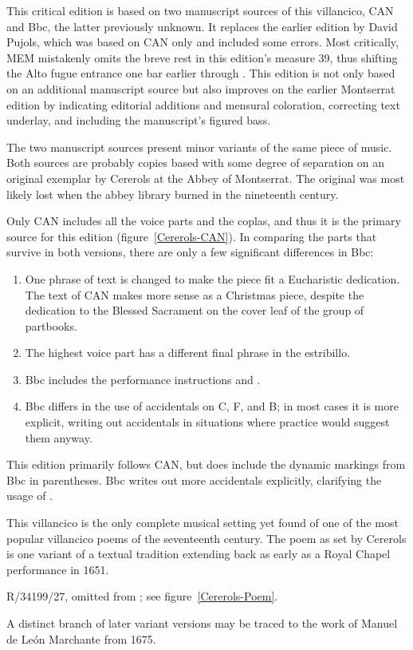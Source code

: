 This critical edition is based on two manuscript sources of this villancico, 
CAN and Bbc, the latter previously unknown.
It replaces the earlier edition by David Pujols, which was based on CAN only 
and included some errors.
Most critically, MEM mistakenly omits the breve rest in this edition's measure 
39, thus shifting the Alto fugue entrance one bar earlier through .
This edition is not only based on an additional manuscript source but also 
improves on the earlier Montserrat edition by indicating editorial additions 
and mensural coloration, correcting text underlay, and including the 
manuscript's figured bass.

The two manuscript sources present minor variants of the same piece of music.
Both sources are probably copies based with some degree of separation on an 
original exemplar by Cererols at the Abbey of Montserrat.
The original was most likely lost when the abbey library burned in the 
nineteenth century.

Only CAN includes all the voice parts and the coplas, and thus it is the 
primary source for this edition (figure~\ref{Cererols-CAN}).%
  \autocite[60--61]{Bonastre:CanetCatalog}
In comparing the parts that survive in both versions, there are only a few 
significant differences in Bbc: 
\begin{enumerate}
    \item One phrase of text is changed to make the piece fit a Eucharistic
        dedication.  
        The text of CAN makes more sense as a Christmas piece, despite the
        dedication to the Blessed Sacrament on the cover leaf of the group of
        partbooks.
    \item The highest voice part has a different final phrase in the estribillo.
    \item Bbc includes the performance instructions  and .
    \item Bbc differs in the use of accidentals on C, F, and B; in most cases
        it is more explicit, writing out accidentals in situations where
         practice would suggest them anyway.
\end{enumerate}
This edition primarily follows CAN, but does include the dynamic markings from 
Bbc in parentheses.
Bbc writes out more accidentals explicitly, clarifying the usage of .



This villancico is the only complete musical setting yet found of one of the 
most popular villancico poems of the seventeenth century.
The poem as set by Cererols is one variant of a textual tradition extending 
back as early as a Royal Chapel performance in 1651.%
\begin{Footnote}
    \signature{E-Mn}{R/34199/27}, omitted from \autocite{BNE:VCs17C}; see
    figure~\ref{Cererols-Poem}.
\end{Footnote}
A distinct branch of later variant versions may be traced to the work of Manuel 
de León Marchante from 1675.

